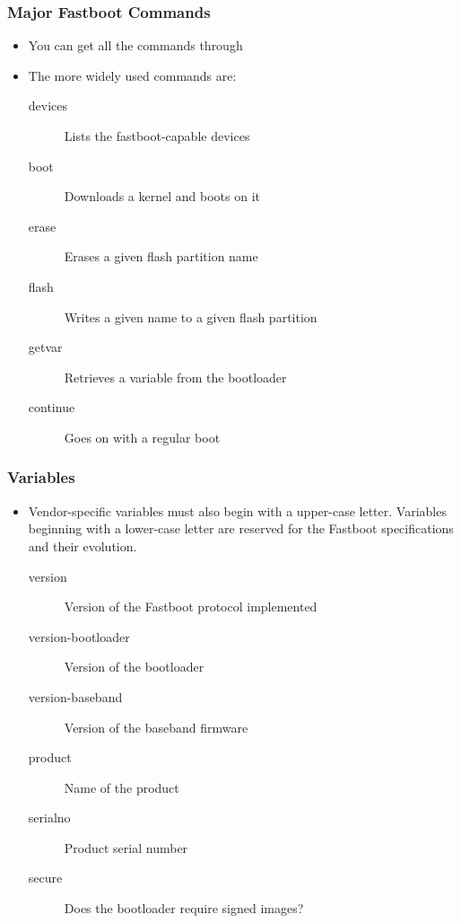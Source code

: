 \begin{frame}
  \frametitle{Major Fastboot Commands}
  \begin{itemize}
  \item You can get all the commands through 
  \item The more widely used commands are:
    \begin{description}
    \item[devices] Lists the fastboot-capable devices
    \item[boot] Downloads a kernel and boots on it
    \item[erase] Erases a given flash partition name
    \item[flash] Writes a given name to a given flash partition
    \item[getvar] Retrieves a variable from the bootloader
    \item[continue] Goes on with a regular boot
    \end{description}
  \end{itemize}
\end{frame}

\begin{frame}
  \frametitle{ Variables}
  \begin{itemize}
  \item Vendor-specific variables must also begin with a upper-case
    letter. Variables beginning with a lower-case letter are reserved
    for the Fastboot specifications and their evolution.
    \begin{description}
    \item[version] Version of the Fastboot protocol implemented
    \item[version-bootloader] Version of the bootloader
    \item[version-baseband] Version of the baseband firmware
    \item[product] Name of the product
    \item[serialno] Product serial number
    \item[secure] Does the bootloader require signed images?
    \end{description}
  \end{itemize}
\end{frame}
